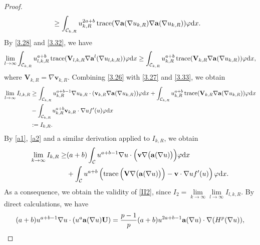 \documentclass[12pt]{amsart}
\theoremstyle{definition}
\theoremstyle{remark}
\theoremstyle{conclusion}
\theoremstyle{conjecture}
\numberwithin{equation}{section}
\begin{document}
\begin{proof}
\begin{equation}
\begin{aligned}
  &\geq \int_{\mathcal{C}_{k,R}}u_{k,R}^{2a+b}\operatorname{trace}(\nabla {\bf{a}}(\nabla u_{k,R})\nabla {\bf{a}}(\nabla u_{k,R}))\varphi\mathrm{d}x.
\end{aligned}
\end{equation}
By \eqref{3.28} and \eqref{3.32}, we have
\begin{equation}\label{3.33}
  \lim\limits_{l\rightarrow\infty}\int_{\mathcal{C}_{k,R}}u_{l,k,R}^{a+b}\operatorname{trace}(\mathbf{V}_{l,k,R}\nabla {\bf{a}}^l(\nabla u_{l,k,R}))\varphi\mathrm{d}x\geq\int_{\mathcal{C}_{k,R}}u_{k,R}^{a+b}\operatorname{trace}(\mathbf{V}_{k,R}\nabla {\bf{a}}(\nabla u_{k,R}))\varphi\mathrm{d}x,
\end{equation}
where $\mathbf{V}_{k,R}=\nabla \mathbf{v}_{k,R}$. Combining \eqref{3.26} with \eqref{3.27} and \eqref{3.33}, we obtain
\begin{equation*}
 \begin{aligned}
  \lim\limits_{l\rightarrow\infty}I_{l,k,R}
 &\geq \int_{\mathcal{C}_{k,R}}u_{k,R}^{a+b-1}\nabla u_{k,R}\cdot (\mathbf{v}_{k,R}\nabla {\bf{a}}(\nabla u_{k,R}))\varphi\mathrm{d}x+\int_{\mathcal{C}_{k,R}}u_{k,R}^{a+b}\operatorname{trace}(\mathbf{V}_{k,R}\nabla {\bf{a}}(\nabla u_{k,R}))\varphi\mathrm{d}x\\
 &-\int_{\mathcal{C}_{k,R}}u_{k,R}^{a+b}\mathbf{v}_{k,R}\cdot \nabla u f^{\prime}(u)\varphi\mathrm{d}x\\
 &:=I_{k,R}.
 \end{aligned}
\end{equation*}
By \eqref{a1}, \eqref{a2} and a similar derivation applied to $I_{k,R}$, we obtain
\begin{equation*}
\begin{aligned}
\lim\limits_{k\rightarrow\infty}I_{k,R}
\geq & (a+b)\int_{\mathcal{C}}u^{a+b-1}\nabla u\cdot \Big(\mathbf{v}\nabla \big({\bf{a}}(\nabla u)\big)\Big)\varphi\mathrm{d}x \\
& +\int_{\mathcal{C}}u^{a+b}\left(\operatorname{trace}\Big(\mathbf{V}\nabla \big( {\bf{a}}(\nabla u)\big)\Big)-\mathbf{v}\cdot \nabla u f^{\prime}(u)\right) \varphi\mathrm{d}x.
\end{aligned}
\end{equation*}
As a consequence, we obtain the validity of \eqref{II2}, since $I_2=\lim\limits_{k\rightarrow\infty}\lim\limits_{l\rightarrow\infty}I_{l,k,R}$. By direct calculations, we have
\begin{equation*}
    (a+b)u^{a+b-1}\nabla u\cdot(u^a{\bf{a}}(\nabla u)\mathbf{U})=\frac{p-1}{p}(a+b)u^{2a+b-1}{\bf{a}}(\nabla u)\cdot\nabla (H^p(\nabla u)),

\end{equation*}
\end{proof}
\end{document}
